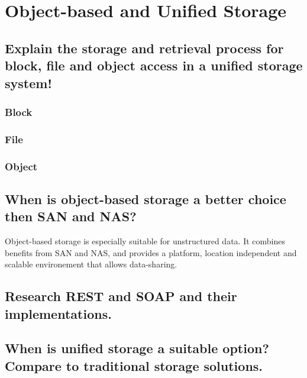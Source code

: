 \section{Object-based and Unified Storage} %
\label{sec:object_based_and_unified_storage}

\subsection{Explain the storage and retrieval process for block, file and object access in a unified storage system!} %
\label{sub:explain_the_storage_and_retrieval_process_for_block_file_and_object_access_in_a_unified_storage_system!}
	\subsubsection{Block} %
	\label{ssub:block}
	
	\subsubsection{File} %
	\label{ssub:file}
	
	\subsubsection{Object} %
	\label{ssub:object}
	

\subsection{When is object-based storage a better choice then SAN and NAS?} %
\label{sub:when_is_object_based_storage_a_better_choice_then_san_and_nas}
	Object-based storage is especially suitable for unstructured data.
	It combines benefits from SAN and NAS,
	and provides a platform, location independent and scalable
	environement that allows data-sharing.

\subsection{Research REST and SOAP and their implementations.} %
\label{sub:research_rest_and_soap_and_their_implementations}


\subsection{When is unified storage a suitable option? Compare to traditional storage solutions.} %
\label{sub:when_is_unified_storage_a_suitable_option_compare_to_traditional_storage_solutions}


